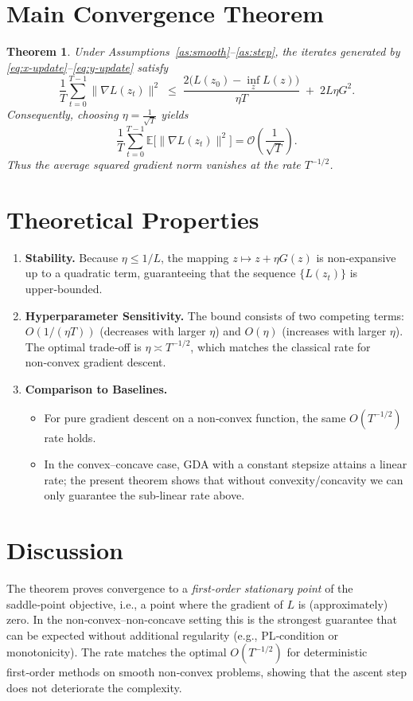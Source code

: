 \documentclass{article}
\newtheorem{theorem}{Theorem}
\begin{document}
\section*{Main Convergence Theorem}
\begin{theorem}\label{thm:main}
Under Assumptions~\ref{as:smooth}--\ref{as:step}, the iterates generated by
\eqref{eq:x-update}--\eqref{eq:y-update} satisfy
\[
\frac{1}{T}\sum_{t=0}^{T-1}\|\nabla L(z_t)\|^{2}
\;\le\;
\frac{2\big(L(z_0)-\inf_{z}L(z)\big)}{\eta T}
\;+\;
2L\eta G^{2}.
\]
Consequently, choosing $\eta = \frac{1}{\sqrt{T}}$ yields
\[
\frac{1}{T}\sum_{t=0}^{T-1}\mathbb{E}\big[\|\nabla L(z_t)\|^{2}\big]
= \mathcal{O}\!\left(\frac{1}{\sqrt{T}}\right).
\]
Thus the average squared gradient norm vanishes at the rate $T^{-1/2}$.
\end{theorem}

\section*{Theoretical Properties}
\begin{enumerate}[label=\arabic*.]
\item \textbf{Stability.}  Because $\eta\le 1/L$, the mapping $z\mapsto z+\eta G(z)$ is
non‑expansive up to a quadratic term, guaranteeing that the sequence $\{L(z_t)\}$ is
upper‑bounded.
\item \textbf{Hyperparameter Sensitivity.}  The bound consists of two competing
terms: $O(1/(\eta T))$ (decreases with larger $\eta$) and $O(\eta)$ (increases with
larger $\eta$).  The optimal trade‑off is $\eta\asymp T^{-1/2}$, which matches the
classical rate for non‑convex gradient descent.
\item \textbf{Comparison to Baselines.}
    \begin{itemize}
        \item For pure gradient descent on a non‑convex function, the same $O(T^{-1/2})$ rate holds.
        \item In the convex–concave case, GDA with a constant stepsize attains a linear rate;
              the present theorem shows that without convexity/concavity we can only
              guarantee the sub‑linear rate above.
    \end{itemize}
\end{enumerate}

\section*{Discussion}
The theorem proves convergence to a \emph{first‑order stationary point} of the
saddle‑point objective, i.e., a point where the gradient of $L$ is (approximately)
zero.  In the non‑convex–non‑concave setting this is the strongest guarantee
that can be expected without additional regularity (e.g., PL‑condition or
monotonicity).  The rate matches the optimal $O(T^{-1/2})$ for deterministic
first‑order methods on smooth non‑convex problems, showing that the ascent step
does not deteriorate the complexity.
\end{document}
